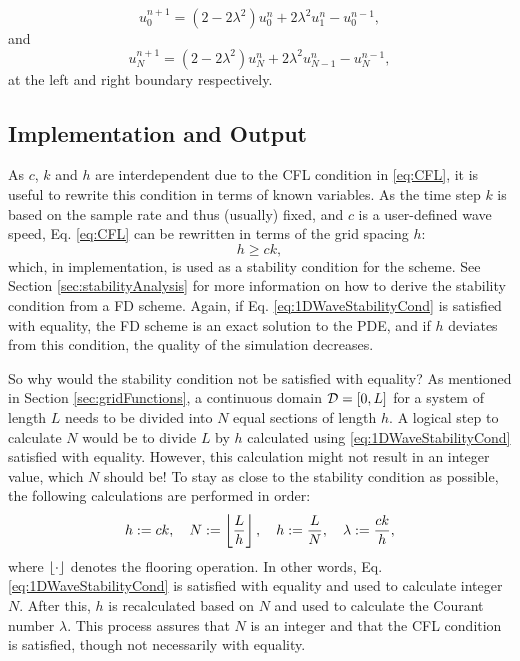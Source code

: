\begin{equation}\label{eq:1DWaveLeftBound}
    u_0^{n+1} = \left(2-2\lambda^2\right) u_0^n  + 2\lambda^2 u_1^n - u_0^{n-1},
\end{equation}
and 
\begin{equation}\label{eq:1DWaveRightBound}
    u_N^{n+1} = \left(2-2\lambda^2\right) u_N^n  + 2\lambda^2 u_{N-1}^n - u_N^{n-1},
\end{equation}
at the left and right boundary respectively.

\subsection{Implementation and Output}\label{sec:output1DWave}
As $c$, $k$ and $h$ are interdependent due to the CFL condition in \eqref{eq:CFL}, it is useful to rewrite this condition in terms of known variables.
As the time step $k$ is based on the sample rate and thus (usually) fixed, and $c$ is a user-defined wave speed, Eq. \eqref{eq:CFL} can be rewritten in terms of the grid spacing $h$:
\begin{equation}\label{eq:1DWaveStabilityCond}
    h \geq ck,
\end{equation}
%
which, in implementation, is used as a stability condition for the scheme. See Section \ref{sec:stabilityAnalysis} for more information on how to derive the stability condition from a FD scheme.
Again, if Eq. \eqref{eq:1DWaveStabilityCond} is satisfied with equality, the FD scheme is an exact solution to the PDE, and if $h$ deviates from this condition, the quality of the simulation decreases. 

So why would the stability condition not be satisfied with equality? As mentioned in Section \ref{sec:gridFunctions}, a continuous domain $\mathcal{D} = [0,L]$ for a system of length $L$ needs to be divided into $N$ equal sections of length $h$. A logical step to calculate $N$ would be to divide $L$ by $h$ calculated using \eqref{eq:1DWaveStabilityCond} satisfied with equality. However, this calculation might not result in an integer value, which $N$ should be! To stay as close to the stability condition as possible, the following calculations are performed in order:
\begin{equation}\label{eq:orderOfCalc}
    h := ck, \quad N := \floor[\frac{L}{h}], \quad h := \frac{L}{N}, \quad \lambda := \frac{ck}{h},
\end{equation}
where $\floor[\cdot]$ denotes the flooring operation. In other words, Eq. \eqref{eq:1DWaveStabilityCond} is satisfied with equality and used to calculate integer $N$. After this, $h$ is recalculated based on $N$ and used to calculate the Courant number $\lambda$. This process assures that $N$ is an integer and that the CFL condition is satisfied, though not necessarily with equality.

